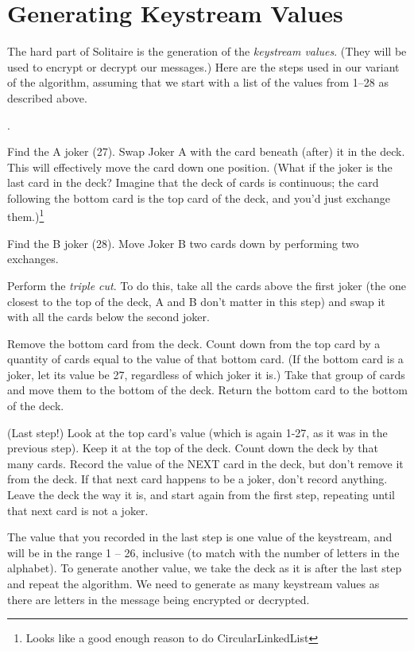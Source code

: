 \documentclass[]{article}
\newcounter{itemcount}
\newenvironment{numlist}
{ \begin{list}
		{\arabic{itemcount}.}
		{\setlength{\itemindent}{0.0cm}   %
			\setlength{\labelwidth}{0.6cm}   %
			\setlength{\labelsep}{0.2cm}     %
			\setlength{\leftmargin}{0.80cm}  %
			\setlength{\rightmargin}{0.0cm}  %
			\setlength{\parsep}{0.0cm plus 0.1cm minus 0.1cm}        %
			\setlength{\topsep}{0.0cm}       %
			\setlength{\itemsep}{0.0cm plus 0.0cm minus 0cm} %
			\setlength{\listparindent}{0.0cm}%
			\usecounter{itemcount}
		}
	}
	{ \end{list} }
\begin{document}
\section{Generating Keystream Values}
The hard part of Solitaire is the generation of the \textit{keystream values}.
(They will be used to encrypt or decrypt our messages.)  Here are the steps
used in our variant of the algorithm,
assuming that we start with a list of the values from 1--28 as described
above.
\begin{numlist}
\item Find the A joker (27).
Swap Joker A with the card beneath (after) it in the deck. 
This  will effectively move the card down one position.  
(What if the joker is the last card in the deck? Imagine that the deck of cards is 
continuous; the card following the bottom card is the top card of the deck, and you'd just exchange them.)\footnote{Looks like a good enough reason to do CircularLinkedList}
\item Find the B joker (28). 
Move Joker B two cards down by performing two exchanges.
\item Perform the \textit{triple cut}. 
To do this, take all the cards above the first joker (the one closest to the top of
the deck, A and B don't matter in this step) and swap it with all the cards below the second joker.  
\item Remove the bottom card from the deck.  
Count down from the top card by a quantity of cards equal to the value of that bottom card. (If the 
bottom card is a joker, let its value be 27, regardless of which 
joker it is.) Take that group of cards and move them to the bottom 
of the deck.  Return the bottom card to the bottom of the deck.
\item (Last step!)  Look at the top card's value (which is again 1-27, as it
was in the previous step).  Keep it at the top of the deck.  
Count down the deck by that many cards.  Record the value of the 
NEXT card in the deck, but don't remove it from the deck.  If that 
next card happens to be a joker, don't record anything.  Leave
the deck the way it is, and start again from the first step, 
repeating until that next card is not a joker.
\end{numlist}

The value that you recorded in the last step is one value of the keystream,
and will be in the range 1 -- 26, inclusive (to match with the number of
letters in the alphabet).  To generate another value, we take the deck 
as it is after the last step and repeat the algorithm.
We need to generate as many keystream values as there are letters in the
message being encrypted or decrypted.
\end{document}
